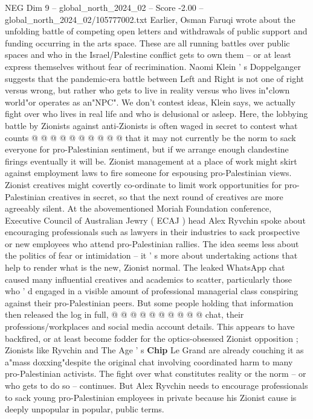 \begin{textsample}{NEG Dim 9 – global\_north\_2024\_02 – Score -2.00 – global\_north\_2024\_02/105777002.txt}
Earlier, Osman Faruqi wrote about the unfolding battle of competing open letters and withdrawals of public support and funding occurring in the arts space.
These are all running battles over public spaces and who in the Israel/Palestine conflict gets to own them -- or at least express themselves without fear of recrimination.
Naomi Klein ' s Doppelganger suggests that the pandemic-era battle between Left and Right is not one of right versus wrong, but rather who gets to live in reality versus who lives in"clown world"or operates as an"NPC".
We don't contest ideas, Klein says, we actually fight over who lives in real life and who is delusional or asleep.
Here, the lobbying battle by Zionists against anti-Zionists is often waged in secret to contest what counts @ @ @ @ @ @ @ @ @ @ that it may not currently be the norm to sack everyone for pro-Palestinian sentiment, but if we arrange enough clandestine firings eventually it will be.
Zionist management at a place of work might skirt against employment laws to fire someone for espousing pro-Palestinian views.
Zionist creatives might covertly co-ordinate to limit work opportunities for pro-Palestinian creatives in secret, so that the next round of creatives are more agreeably silent.
At the abovementioned Moriah Foundation conference, Executive Council of Australian Jewry ( ECAJ ) head Alex Ryvchin spoke about encouraging professionals such as lawyers in their industries to sack prospective or new employees who attend pro-Palestinian rallies.
The idea seems less about the politics of fear or intimidation -- it ' s more about undertaking actions that help to render what is the new, Zionist normal.
The leaked WhatsApp chat caused many influential creatives and academics to scatter, particularly those who ' d engaged in a visible amount of professional managerial class conspiring against their pro-Palestinian peers.
But some people holding that information then released the log in full, @ @ @ @ @ @ @ @ @ @ chat, their professions/workplaces and social media account details.
This appears to have backfired, or at least become fodder for the optics-obsessed Zionist opposition ; Zionists like Ryvchin and The Age ' s \textbf{Chip} Le Grand are already couching it as a"mass doxxing"despite the original chat involving coordinated harm to many pro-Palestinian activists.
The fight over what constitutes reality or the norm -- or who gets to do so -- continues.
But Alex Ryvchin needs to encourage professionals to sack young pro-Palestinian employees in private because his Zionist cause is deeply unpopular in popular, public terms.

\end{textsample}
